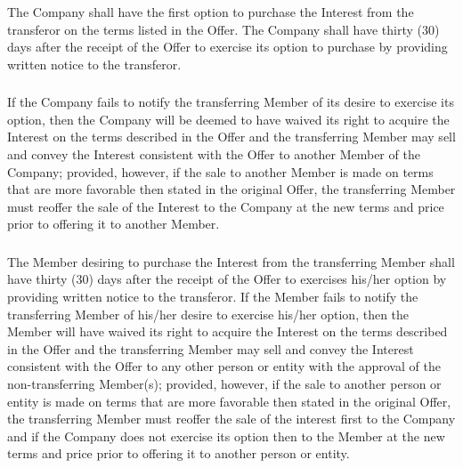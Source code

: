 \documentclass[11pt,onecolumn]{article}
\begin{document}
\subsubsection{}

The Company shall have the first option to purchase the Interest from the transferor on the terms listed in the Offer. The Company shall have thirty (30) days after the receipt of the Offer to exercise its option to purchase by providing written notice to the transferor.

\subsubsection{}

If the Company fails to notify the transferring Member of its desire to exercise its option, then the Company will be deemed to have waived its right to acquire the Interest on the terms described in the Offer and the transferring Member may sell and convey the Interest consistent with the Offer to another Member of the Company; provided, however, if the sale to another Member is made on terms that are more favorable then stated in the original Offer, the transferring Member must reoffer the sale of the Interest to the Company at the new terms and price prior to offering it to another Member.

\subsubsection{}

The Member desiring to purchase the Interest from the transferring Member shall have thirty (30) days after the receipt of the Offer to exercises his/her option by providing written notice to the transferor. If the Member fails to notify the transferring Member of his/her desire to exercise his/her option, then the Member will have waived its right to acquire the Interest on the terms described in the Offer and the transferring Member may sell and convey the Interest consistent with the Offer to any other person or entity with the approval of the non-transferring Member(s); provided, however, if the sale to another person or entity is made on terms that are more favorable then stated in the original Offer, the transferring Member must reoffer the sale of the interest first to the Company and if the Company does not exercise its option then to the Member at the new terms and price prior to offering it to another person or entity.

\subsubsection{}
\end{document}
